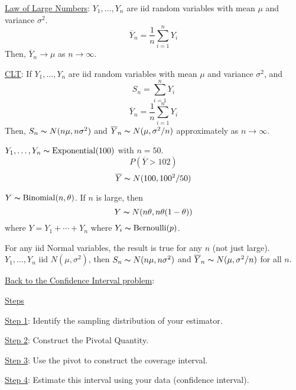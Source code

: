 \underline{Law of Large Numbers}: $ Y_1,\ldots ,Y_n $ are iid random
variables with mean $ \mu $ and variance $ \sigma^2 $.
\[ \overline{Y}_n=\frac{1}{n} \sum\limits_{i=1}^{n} Y_i \]
Then, $ \overline{Y}_n\to \mu $ as $ n\to \infty $.

\underline{CLT}: If $ Y_1,\ldots ,Y_n $ are iid random variables
with mean $ \mu $ and variance $ \sigma^2 $, and
\[ S_n=\sum\limits_{i=1}^{n} Y_i \]
\[ \overline{Y}_n=\frac{1}{n} \sum\limits_{i=1}^{n} Y_i \]
Then, $ S_n \thicksim N(n\mu,n\sigma^2) $ and $ \overline{Y}_n
    \thicksim N(\mu,\sigma^2/n) $ approximately as $ n\to \infty $.
\begin{exbox}
    \begin{example}
        $ Y_1,\ldots ,Y_n \thicksim \operatorname{Exponential}(100) $ with $ n=50 $.
        \[ P(\overline{Y}>102) \]
        \[ \overline{Y} \thicksim N(100,100^2/50) \]
    \end{example}
\end{exbox}
\begin{exbox}
    \begin{example}
        $ Y \thicksim \operatorname{Binomial}(n,\theta) $. If $ n $ is large, then
        \[ Y \thicksim N(n\theta,n\theta(1-\theta)) \]
        where $ Y=Y_1+\cdots+Y_n $ where $ Y_i \thicksim \text{Bernoulli}(p) $.
    \end{example}
\end{exbox}
\begin{exbox}
    \begin{example}
        For any iid Normal variables, the result is true for any $ n $ (not just large).
        $ Y_1,\ldots ,Y_n $ iid $ N(\mu,\sigma^2) $, then $ S_n \thicksim N(n\mu,n\sigma^2) $
        and $ \overline{Y}_n \thicksim N(\mu,\sigma^2/n) $ for all $ n $.
    \end{example}
\end{exbox}
\underline{Back to the Confidence Interval problem}:

\underline{Steps}

\underline{Step 1}: Identify the sampling distribution of your estimator.

\underline{Step 2}: Construct the Pivotal Quantity.

\underline{Step 3}: Use the pivot to construct the coverage interval.

\underline{Step 4}: Estimate this interval using your data (confidence interval).

